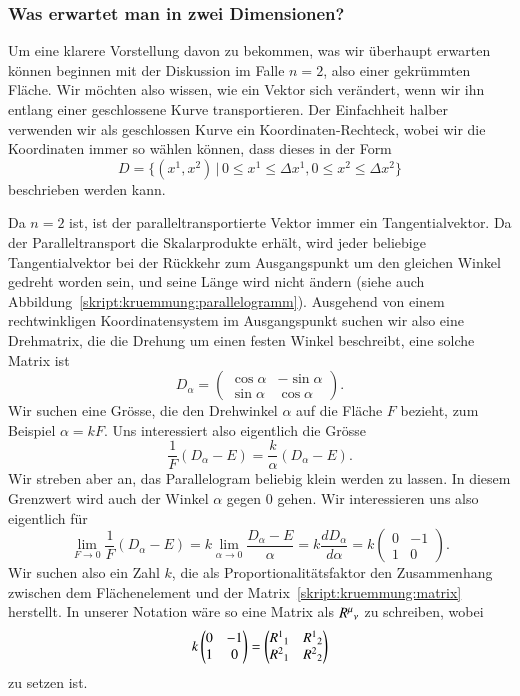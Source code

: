 \subsubsection{Was erwartet man in zwei Dimensionen?}
Um eine klarere Vorstellung davon zu bekommen, was wir überhaupt erwarten
können beginnen mit der Diskussion im Falle $n=2$, also einer gekrümmten
Fläche.
Wir möchten also wissen, wie ein Vektor sich verändert, wenn wir ihn
entlang einer geschlossene Kurve transportieren.
Der Einfachheit halber verwenden wir als geschlossen Kurve
ein Koordinaten-Rechteck, wobei wir die Koordinaten immer so wählen
können, dass dieses in der Form
\[
D=\{ (x^1,x^2)\,|\,
0\le x^1 \le \Delta x^1, 
0\le x^2 \le \Delta x^2 \}
\]
beschrieben werden kann.

Da $n=2$ ist, ist der paralleltransportierte Vektor immer ein
Tangentialvektor.
Da der Paralleltransport die Skalarprodukte erhält, wird jeder beliebige
Tangentialvektor bei der Rückkehr zum Ausgangspunkt um den gleichen
Winkel gedreht worden sein, und seine Länge wird nicht ändern
(siehe auch Abbildung~\ref{skript:kruemmung:parallelogramm}).
Ausgehend von einem rechtwinkligen Koordinatensystem im Ausgangspunkt
suchen wir also eine Drehmatrix, die die Drehung um einen festen Winkel
beschreibt, eine solche Matrix ist
\[
D_{\alpha}
=
\begin{pmatrix}
\cos\alpha&-\sin\alpha\\
\sin\alpha& \cos\alpha
\end{pmatrix}.
\]
Wir suchen eine Grösse, die den Drehwinkel $\alpha$ auf die
Fläche $F$ bezieht, zum Beispiel $\alpha=kF$.
Uns interessiert also eigentlich die Grösse
\[
\frac{1}{F}(D_{\alpha}-E)
=
\frac{k}{\alpha}(D_{\alpha}-E).
\]
Wir streben aber an, das Parallelogram beliebig klein werden zu lassen.
In diesem Grenzwert wird auch der Winkel $\alpha$ gegen $0$ gehen.
Wir interessieren uns also eigentlich für
\begin{equation}
\lim_{F\to 0}\frac{1}{F}(D_{\alpha}-E)
=
k \lim_{\alpha\to 0}
\frac{D_\alpha - E}{\alpha}
=
k \frac{dD_\alpha}{d\alpha}
=
k
\begin{pmatrix}
0&-1\\
1&0
\end{pmatrix}.
\label{skript:kruemmung:matrix}
\end{equation}
Wir suchen also ein Zahl $k$, die als Proportionalitätsfaktor den Zusammenhang
zwischen dem Flächen\-element und der Matrix~\eqref{skript:kruemmung:matrix}
herstellt.
In unserer Notation wäre so eine Matrix als $R^\mu\mathstrut_\nu$ zu
schreiben, wobei
\[
k
\begin{pmatrix}
0&-1\\
1&0
\end{pmatrix}
=
\begin{pmatrix}
R^1\mathstrut_1&R^1\mathstrut_2\\
R^2\mathstrut_1&R^2\mathstrut_2
\end{pmatrix}
\]
zu setzen ist.

